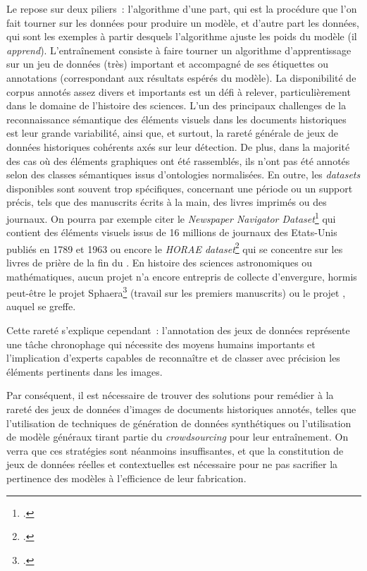 
Le \ml repose sur deux piliers~: l'algorithme d'une part,
qui est la procédure que l'on fait tourner sur les données pour produire
un modèle, et d'autre part les données, qui sont les exemples à partir
desquels l'algorithme ajuste les poids du modèle (il \emph{apprend}).
L'entraînement consiste à faire tourner un algorithme d'apprentissage
sur un jeu de données (très) important et accompagné de ses étiquettes
ou annotations (correspondant aux résultats espérés du modèle). La
disponibilité de corpus annotés assez divers et importants est un défi à
relever, particulièrement dans le domaine de l'histoire des sciences.
L'un des principaux challenges de la reconnaissance sémantique des
éléments visuels dans les documents historiques est leur grande
variabilité, ainsi que, et surtout, la rareté générale de jeux de
données historiques cohérents axés sur leur détection. De plus, dans la majorité des cas où des éléments graphiques
ont été rassemblés, ils n'ont pas été annotés selon des classes
sémantiques issus d'ontologies normalisées. En outre, les
\emph{datasets} disponibles sont souvent trop spécifiques, concernant
une période ou un support précis, tels que des manuscrits écrits à la
main, des livres imprimés ou des journaux. On pourra par exemple citer
le \emph{Newspaper Navigator Dataset}\footcite{lee_newspaper_2020} qui contient des
éléments visuels issus de 16 millions de journaux des Etats-Unis publiés
en 1789 et 1963 ou encore le \emph{HORAE dataset}\footcite{noauthor_horae_nodate} qui se
concentre sur les livres de prière de la fin du \ma. En histoire
des sciences astronomiques ou mathématiques, aucun projet n'a encore
entrepris de collecte d'envergure, hormis peut-être le projet
Sphaera\footcite{noauthor_sphere_nodate} (travail sur les premiers manuscrits) ou le projet \vhs, auquel \eida se greffe.

Cette rareté s'explique cependant~: l'annotation des jeux de données
représente une tâche chronophage qui nécessite des moyens humains
importants et l'implication d'experts capables de reconnaître et de
classer avec précision les éléments pertinents dans les images.

Par conséquent, il est nécessaire de trouver des solutions pour remédier à
la rareté des jeux de données d'images de documents historiques
annotés, telles que l'utilisation de techniques de génération de
données synthétiques ou l'utilisation de modèle généraux tirant partie
du \textit{crowdsourcing} pour leur entraînement. On verra que ces stratégies sont néanmoins
insuffisantes, et que la constitution de jeux de données réelles et
contextuelles est nécessaire pour ne pas sacrifier la pertinence des
modèles à l'efficience de leur fabrication.

